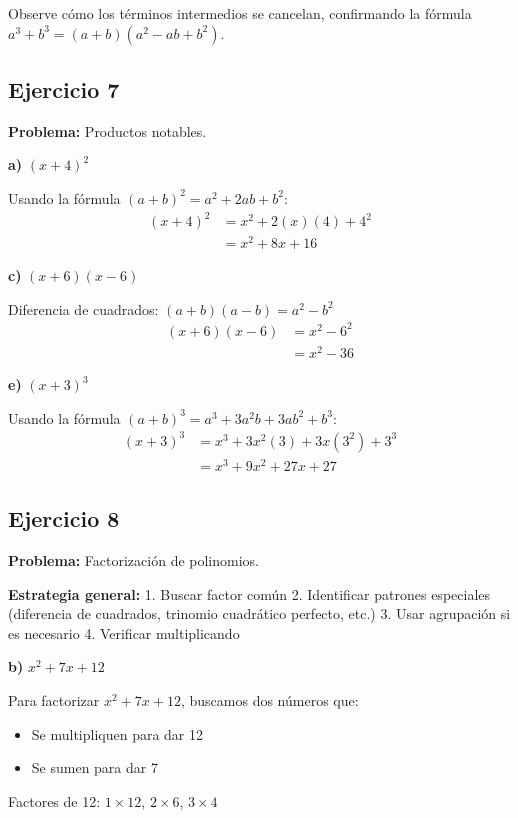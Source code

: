 Observe cómo los términos intermedios se cancelan, confirmando la fórmula $a^3 + b^3 = (a + b)(a^2 - ab + b^2)$.

\subsection*{Ejercicio 7}

\textbf{Problema:} Productos notables.

\textbf{a)} $(x + 4)^2$

Usando la fórmula $(a + b)^2 = a^2 + 2ab + b^2$:
\begin{align}
(x + 4)^2 &= x^2 + 2(x)(4) + 4^2\\
&= x^2 + 8x + 16
\end{align}

\textbf{c)} $(x + 6)(x - 6)$

Diferencia de cuadrados: $(a + b)(a - b) = a^2 - b^2$
\begin{align}
(x + 6)(x - 6) &= x^2 - 6^2\\
&= x^2 - 36
\end{align}

\textbf{e)} $(x + 3)^3$

Usando la fórmula $(a + b)^3 = a^3 + 3a^2b + 3ab^2 + b^3$:
\begin{align}
(x + 3)^3 &= x^3 + 3x^2(3) + 3x(3^2) + 3^3\\
&= x^3 + 9x^2 + 27x + 27
\end{align}

\subsection*{Ejercicio 8}

\textbf{Problema:} Factorización de polinomios.

\textbf{Estrategia general:}
1. Buscar factor común
2. Identificar patrones especiales (diferencia de cuadrados, trinomio cuadrático perfecto, etc.)
3. Usar agrupación si es necesario
4. Verificar multiplicando

\textbf{b)} $x^2 + 7x + 12$

Para factorizar $x^2 + 7x + 12$, buscamos dos números que:
\begin{itemize}
    \item Se multipliquen para dar 12
    \item Se sumen para dar 7
\end{itemize}

Factores de 12: $1 \times 12$, $2 \times 6$, $3 \times 4$

